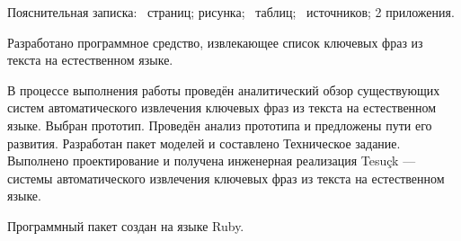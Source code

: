 \Referat
Пояснительная записка: \totalpages~страниц; \totalfigures рисунка;
\totaltables~таблиц; \totalbibs~источников; 2 приложения.

Разработано программное средство, извлекающее список ключевых
фраз из текста на естественном языке.

В процессе выполнения работы проведён аналитический обзор
существующих систем автоматического извлечения ключевых фраз из
текста на естественном языке. Выбран прототип. Проведён анализ
прототипа и предложены пути его развития. Разработан пакет моделей и
составлено Техническое задание. Выполнено проектирование и
получена инженерная реализация Tesuçk — системы автоматического
извлечения ключевых фраз из текста на естественном языке.

Программный пакет создан на языке Ruby.
